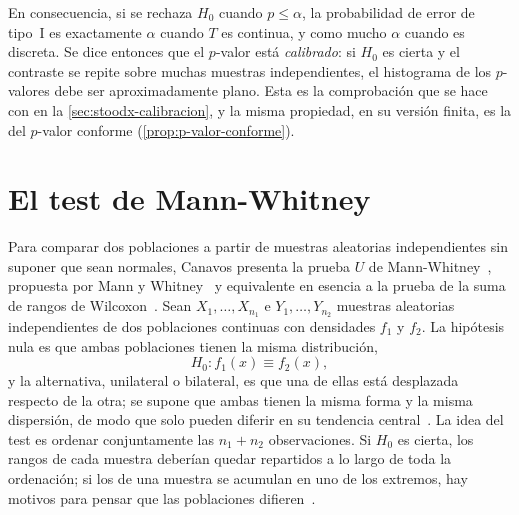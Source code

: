 En consecuencia, si se rechaza $H_0$ cuando $p \le \alpha$, la probabilidad de error de tipo~I es exactamente $\alpha$ cuando $T$ es continua, y como mucho $\alpha$ cuando es discreta. Se dice entonces que el $p$-valor está \emph{calibrado}: si $H_0$ es cierta y el contraste se repite sobre muchas muestras independientes, el histograma de los $p$-valores debe ser aproximadamente plano. Esta es la comprobación que se hace con \stoodx en la \cref{sec:stoodx-calibracion}, y la misma propiedad, en su versión finita, es la del $p$-valor conforme (\cref{prop:p-valor-conforme}).

\section{El test de Mann-Whitney}\label{sec:mann-whitney}


Para comparar dos poblaciones a partir de muestras aleatorias independientes sin suponer que sean normales, Canavos presenta la prueba $U$ de Mann-Whitney~\cite[sec.~15.2.1]{canavos2003}, propuesta por Mann y Whitney~\cite{mann1947} y equivalente en esencia a la prueba de la suma de rangos de Wilcoxon~\cite{wilcoxon1945}. Sean $X_1, \dots, X_{n_1}$ e $Y_1, \dots, Y_{n_2}$ muestras aleatorias independientes de dos poblaciones continuas con densidades $f_1$ y $f_2$. La hipótesis nula es que ambas poblaciones tienen la misma distribución,
\[
  H_0\colon f_1(x) \equiv f_2(x),
\]
y la alternativa, unilateral o bilateral, es que una de ellas está desplazada respecto de la otra; se supone que ambas tienen la misma forma y la misma dispersión, de modo que solo pueden diferir en su tendencia central~\cite[sec.~15.2.1]{canavos2003}. La idea del test es ordenar conjuntamente las $n_1 + n_2$ observaciones. Si $H_0$ es cierta, los rangos de cada muestra deberían quedar repartidos a lo largo de toda la ordenación; si los de una muestra se acumulan en uno de los extremos, hay motivos para pensar que las poblaciones difieren~\cite[sec.~15.2.1]{canavos2003}.


